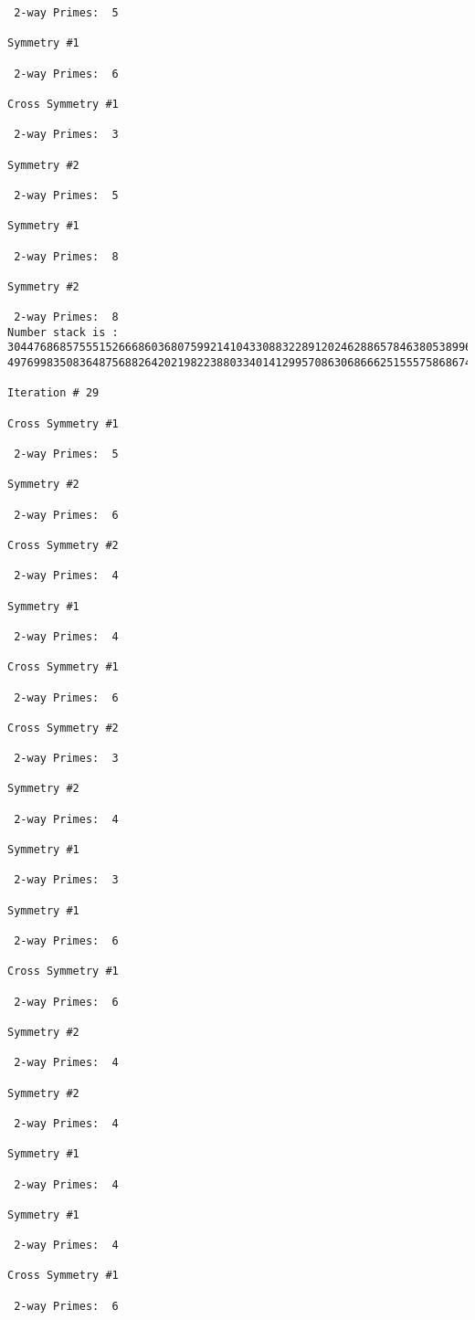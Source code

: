 \begin{verbatim}
 2-way Primes: 	5

Symmetry #1

 2-way Primes: 	6

Cross Symmetry #1

 2-way Primes: 	3

Symmetry #2

 2-way Primes: 	5

Symmetry #1

 2-way Primes: 	8

Symmetry #2

 2-way Primes: 	8
Number stack is :
30447686857555152666860368075992141043308832289120246288657846380538996794608835958544046240163340857
49769983508364875688264202198223880334014129957086306866625155575868674403758043361042640445859538806

Iteration #	29

Cross Symmetry #1

 2-way Primes: 	5

Symmetry #2

 2-way Primes: 	6

Cross Symmetry #2

 2-way Primes: 	4

Symmetry #1

 2-way Primes: 	4

Cross Symmetry #1

 2-way Primes: 	6

Cross Symmetry #2

 2-way Primes: 	3

Symmetry #2

 2-way Primes: 	4

Symmetry #1

 2-way Primes: 	3

Symmetry #1

 2-way Primes: 	6

Cross Symmetry #1

 2-way Primes: 	6

Symmetry #2

 2-way Primes: 	4

Symmetry #2

 2-way Primes: 	4

Symmetry #1

 2-way Primes: 	4

Symmetry #1

 2-way Primes: 	4

Cross Symmetry #1

 2-way Primes: 	6


\end{verbatim}

